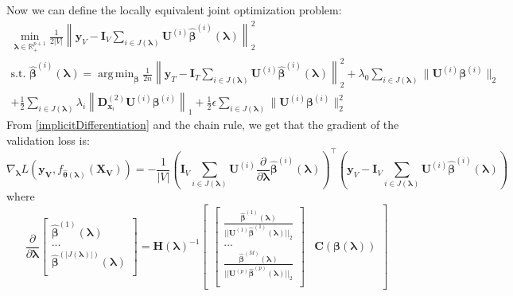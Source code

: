 \documentclass[12pt]{article}
\DeclareMathOperator*{\argmin}{arg\,min}
\begin{document}
Now we can define the locally equivalent joint optimization problem:
\begin{equation}
\begin{array}{c}
\min_{\boldsymbol{\lambda} \in \mathbb{R}^{p+1}_{+}}
\frac{1}{2|V|} \left \| \boldsymbol{y}_V
- \boldsymbol{I}_V \sum_{i\in J(\boldsymbol\lambda)} \boldsymbol {U}^{(i)} \hat{\boldsymbol{\beta}}^{(i)}(\boldsymbol{\lambda})
 \right \|^2_2 \\
\text{s.t. }
\hat{\boldsymbol{\beta}}^{(i)}(\boldsymbol{\lambda}) = \argmin_{\boldsymbol \beta}
\frac{1}{2n} \left \| \boldsymbol{y}_T
- \boldsymbol{I}_T \sum_{i\in J(\boldsymbol\lambda)} \boldsymbol {U}^{(i)} \hat{\boldsymbol{\beta}}^{(i)}(\boldsymbol{\lambda})
\right \|^2_2
+ \lambda_0 \sum_{i\in J(\boldsymbol\lambda)}  \| \boldsymbol {U}^{(i)} \boldsymbol{\beta}^{(i)} \|_2 \\
+ \frac{1}{2} \sum_{i\in J(\boldsymbol\lambda)} \lambda_i \left \| \boldsymbol{D}^{(2)}_{\boldsymbol{x}_i} \boldsymbol {U}^{(i)} \boldsymbol{\beta}^{(i)} \right \|_1
+ \frac{1}{2} \epsilon \sum_{i\in J(\boldsymbol\lambda)} \| \boldsymbol {U}^{(i)} \boldsymbol{\beta}^{(i)} \|_2^2
\end{array}
\end{equation}
From \eqref{implicitDifferentiation} and the chain rule, we get that the gradient of the validation loss is:
\begin{equation}
\nabla_{\boldsymbol \lambda} L(\boldsymbol{y_V}, f_{\hat{\boldsymbol{\theta}}(\boldsymbol{\lambda})}(\boldsymbol{X_V})) =
- \frac{1}{|V|}
\left (
\boldsymbol{I}_V \sum_{i\in J(\boldsymbol\lambda)}  \boldsymbol {U}^{(i)} \frac{\partial}{\partial \boldsymbol\lambda} \hat{\boldsymbol{\beta}}^{(i)}(\boldsymbol{\lambda})
\right )^\top
\left (
\boldsymbol{y}_V - \boldsymbol{I}_V \sum_{i\in J(\boldsymbol\lambda)} \boldsymbol {U}^{(i)} \hat{\boldsymbol{\beta}}^{(i)} (\boldsymbol\lambda)
\right )
\end{equation}
where
\begin{equation}
\frac{\partial}{\partial \boldsymbol{\lambda}} 
\begin{bmatrix}
\hat{\boldsymbol{\beta}}^{(1)}(\boldsymbol{\lambda})\\
...\\
\hat{\boldsymbol{\beta}}^{(|J(\boldsymbol{\lambda})|)}(\boldsymbol{\lambda})\\
\end{bmatrix}
= 
\boldsymbol{H}(\boldsymbol\lambda)^{-1}
\begin{bmatrix}
\begin{bmatrix}
\frac{\hat{\boldsymbol{\beta}}^{(1)}(\boldsymbol \lambda)}{||\boldsymbol {U}^{(1)}  \hat{\boldsymbol{\beta}}^{(1)} (\boldsymbol \lambda)||_2}\\
...\\
\frac{\hat{\boldsymbol \beta}^{(M)} (\boldsymbol \lambda)}{||\boldsymbol {U}^{(p)}  \hat{\boldsymbol{\beta}}^{(p)}(\boldsymbol \lambda)||_2}\\
\end{bmatrix}
&
\boldsymbol C(\boldsymbol \beta( \boldsymbol \lambda))
\end{bmatrix}
\label{eq:additive_gradient}
\end{equation}
\end{document}
